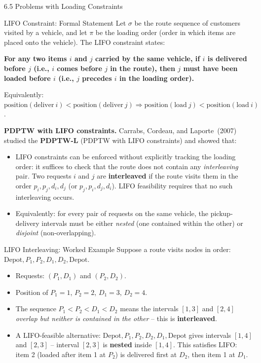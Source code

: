 \documentclass[aspectratio=169,10pt]{beamer}
\begin{document}
\begin{frame}[allowframebreaks]{6.5 Problems with Loading Constraints}
  \begin{block}{LIFO Constraint: Formal Statement}
    Let $\sigma$ be the route sequence of customers visited by a vehicle, and let
    $\pi$ be the loading order (order in which items are placed onto the vehicle).
    The LIFO constraint states:

    \textbf{For any two items $i$ and $j$ carried by the same vehicle, if $i$ is
    delivered before $j$ (i.e., $i$ comes before $j$ in the route), then $j$ must
    have been loaded before $i$ (i.e., $j$ precedes $i$ in the loading order).}

    Equivalently: $\text{position}(\text{deliver}\ i) < \text{position}(\text{deliver}\ j)
    \Rightarrow \text{position}(\text{load}\ j) < \text{position}(\text{load}\ i)$.
  \end{block}

  \framebreak

  \textbf{PDPTW with LIFO constraints.} Carrabs, Cordeau, and Laporte~(2007) studied the
  \textbf{PDPTW-L} (PDPTW with LIFO constraints) and showed that:
  \begin{itemize}
    \item LIFO constraints can be enforced without explicitly tracking the loading order:
          it suffices to check that the route does not contain any \emph{interleaving} pair.
          Two requests $i$ and $j$ are \textbf{interleaved} if the route visits them in
          the order $p_i, p_j, d_i, d_j$ (or $p_j, p_i, d_j, d_i$). LIFO feasibility
          requires that no such interleaving occurs.
    \item Equivalently: for every pair of requests on the same vehicle, the pickup-delivery
          intervals must be either \emph{nested} (one contained within the other) or
          \emph{disjoint} (non-overlapping).
  \end{itemize}

  \begin{exampleblock}{LIFO Interleaving: Worked Example}
    Suppose a route visits nodes in order: $\text{Depot}, P_1, P_2, D_1, D_2, \text{Depot}$.
    \begin{itemize}
      \item Requests: $(P_1, D_1)$ and $(P_2, D_2)$.
      \item Position of $P_1 = 1$, $P_2 = 2$, $D_1 = 3$, $D_2 = 4$.
      \item The sequence $P_1 < P_2 < D_1 < D_2$ means the intervals $[1,3]$ and $[2,4]$
            \emph{overlap but neither is contained in the other} -- this is \textbf{interleaved}.
      \item A LIFO-feasible alternative: $\text{Depot}, P_1, P_2, D_2, D_1, \text{Depot}$
            gives intervals $[1,4]$ and $[2,3]$ -- interval $[2,3]$ is \textbf{nested}
            inside $[1,4]$. This satisfies LIFO: item 2 (loaded after item 1 at $P_2$)
            is delivered first at $D_2$, then item 1 at $D_1$. \checkmark
    \end{itemize}
  \end{exampleblock}


\end{frame}
\end{document}
